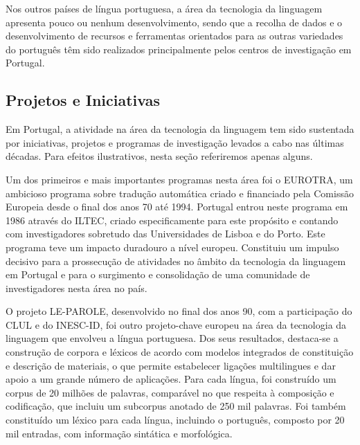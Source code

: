 \begin{multicols}{2}
Nos outros países de língua portuguesa, a área da tecnologia da linguagem apresenta pouco ou nenhum desenvolvimento, 
sendo que a recolha de dados e o desenvolvimento de recursos e ferramentas orientados para as outras variedades do português 
têm sido realizados principalmente pelos centros de investigação em Portugal.

\subsection{Projetos e Iniciativas}

Em Portugal, a atividade na área da tecnologia da linguagem tem sido sustentada
por iniciativas, projetos e programas de investigação levados a cabo nas últimas décadas. 
Para efeitos ilustrativos, nesta seção referiremos apenas alguns.

Um dos primeiros e mais importantes programas nesta área foi o EUROTRA, 
um ambicioso programa sobre tradução automática criado e financiado pela Comissão Europeia desde o final dos anos 70 até 1994. 
Portugal entrou neste programa em 1986 através do ILTEC, criado especificamente para este propósito
e contando com investigadores sobretudo das Universidades de Lisboa e do Porto. 
Este programa teve um impacto duradouro a nível europeu. 
Constituiu um impulso decisivo para a prossecução de atividades no âmbito da tecnologia da linguagem em Portugal 
e para o surgimento e consolidação de uma comunidade de investigadores nesta área no país.

O projeto LE-PAROLE, desenvolvido no final dos anos 90, com a participação do CLUL e do INESC-ID, 
foi outro projeto-chave europeu na área da tecnologia da linguagem que envolveu a língua portuguesa. 
Dos seus resultados, destaca-se a construção de corpora e léxicos de acordo com modelos integrados 
de constituição e descrição de materiais, o que permite estabelecer ligações multilingues 
e dar apoio a um grande número de aplicações. 
Para cada língua, foi construído um corpus de 20 milhões de palavras, comparável no que res\-pei\-ta à composição e codificação, 
que incluiu um subcorpus anotado de 250 mil palavras. 
Foi também constituído um léxico para cada língua, incluindo o português, composto por 20 mil entradas, 
com informação sintática e morfológica.


\end{multicols}
